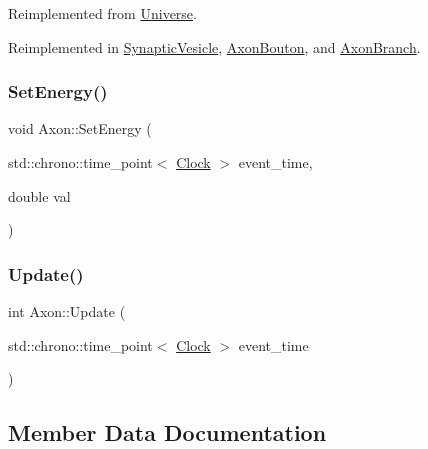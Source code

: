 Reimplemented from \mbox{\hyperlink{classUniverse_aa22202ae740eb1355529afcb13285e91}{Universe}}.



Reimplemented in \mbox{\hyperlink{classSynapticVesicle_a7fd7cfce5eccb904206d968866f85220}{Synaptic\+Vesicle}}, \mbox{\hyperlink{classAxonBouton_afe285478d414f2815afb98abe7b92898}{Axon\+Bouton}}, and \mbox{\hyperlink{classAxonBranch_a96ba30b18627563d637d4e02fac943be}{Axon\+Branch}}.

\mbox{\label{classAxon_af5108f451de97deb56138e8e81ced359}} 
\subsubsection{\texorpdfstring{Set\+Energy()}{SetEnergy()}}
{\footnotesize\ttfamily void Axon\+::\+Set\+Energy (\begin{DoxyParamCaption}\item[{std\+::chrono\+::time\+\_\+point$<$ \mbox{\hyperlink{universe_8h_a0ef8d951d1ca5ab3cfaf7ab4c7a6fd80}{Clock}} $>$}]{event\+\_\+time,  }\item[{double}]{val }\end{DoxyParamCaption})\hspace{0.3cm}{\ttfamily [inline]}}

\mbox{\label{classAxon_a472ee760a1727072afaff0035d1eedd9}} 
\subsubsection{\texorpdfstring{Update()}{Update()}}
{\footnotesize\ttfamily int Axon\+::\+Update (\begin{DoxyParamCaption}\item[{std\+::chrono\+::time\+\_\+point$<$ \mbox{\hyperlink{universe_8h_a0ef8d951d1ca5ab3cfaf7ab4c7a6fd80}{Clock}} $>$}]{event\+\_\+time }\end{DoxyParamCaption})}



\subsection{Member Data Documentation}
\mbox{\label{classAxon_abbd92e8cf3ef8204baab98e7cbb08c64}} 
